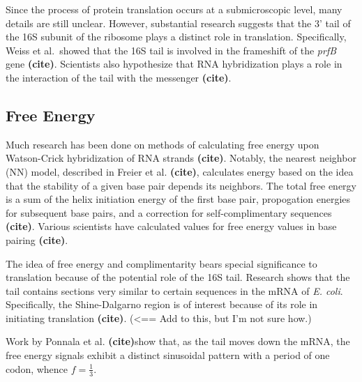 \documentclass[12pt,titlepage,draft]{article}
\providecommand{\hj}{\textbf{(cite)}}
\numberwithin{equation}{section}
\begin{document}
Since the process of protein translation occurs at a submicroscopic level, many details are still unclear.
    However, substantial research suggests that the 3' tail of the 16S subunit of the ribosome plays a distinct role in translation.  Specifically, Weiss et al.\ showed that the 16S tail is involved in the frameshift of the {\emph{prfB}} gene \hj.  Scientists also hypothesize that RNA hybridization plays a role in the interaction of the tail with the messenger \hj.

\subsection{Free Energy}
\label{sec:freeenergy}

Much research has been done on methods of calculating free energy upon Watson-Crick hybridization of RNA strands \hj.  Notably, the nearest neighbor (NN) model, described in Freier et al. \hj, calculates energy based on the idea that the stability of a given base pair depends its neighbors.
    The total free energy is a sum of the helix initiation energy of the first base pair, propogation energies for subsequent base pairs, and a correction for self-complimentary sequences \hj.  Various scientists have calculated values for free energy values in base pairing \hj.

The idea of free energy and complimentarity bears special significance to translation because of the potential role of the 16S tail.  Research shows that the tail contains sections very similar to certain sequences in the mRNA of \emph{E. coli}.  Specifically, the Shine-Dalgarno region is of interest because of its role in initiating translation \hj. (<== Add to this, but I'm not sure how.)

Work by Ponnala et al. \hj show that, as the tail moves down the mRNA, the free energy signals exhibit a distinct sinusoidal pattern with a period of one codon, whence $f = \frac{1}{3}$.
\end{document}
